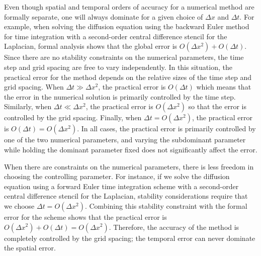 \documentclass[fleqn,12pt,twoside]{article}
\def\dt{\Delta t}
\def\dx{\Delta x}
\begin{document}
Even though spatial and temporal orders of accuracy for a numerical method
are formally separate, one will always dominate for a given choice of 
$\dx$ and $\dt$.  For example, when solving the diffusion equation 
using the backward Euler method for time integration with a second-order 
central difference stencil for the Laplacian, formal analysis shows that 
the global error is $O(\dx^2) + O(\dt)$.  Since there are no 
stability constraints on the numerical parameters, the time
step and grid spacing are free to vary independently.  In this situation, the 
practical error for the method depends on the relative sizes of the time step 
and grid spacing.  When $\dt \gg \dx^2$, the practical error is 
$O(\dt)$ which means that the error in the numerical solution is 
primarily controlled by the time step.  Similarly, when 
$\dt \ll \dx^2$, the practical error is $O(\dx^2)$ so that 
the error is controlled by the grid spacing.  Finally, when 
$\dt  = O(\dx^2)$, the practical error is 
$O(\dt) = O(\dx^2)$.  In all cases, the practical error is 
primarily controlled by one of the two numerical parameters, and varying
the subdominant parameter while holding the dominant parameter fixed does 
not significantly affect the error.
 
When there are constraints on the numerical parameters, there is less freedom 
in choosing the controlling parameter.  For instance, if we solve the 
diffusion equation using a forward Euler time integration scheme with a 
second-order central difference stencil for the Laplacian, stability
considerations require that we choose $\dt = O(\dx^2)$.  
Combining this stability constraint with the formal error for the scheme
shows that the practical error is 
$O(\dx^2) + O(\dt) = O(\dx^2)$.  Therefore, the accuracy of the 
method is completely controlled by the grid spacing; the temporal error can 
never dominate the spatial error.
\end{document}
